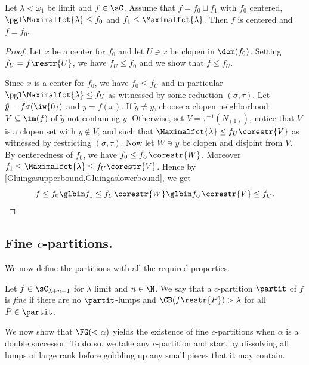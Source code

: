 \begin{lemma}\label{lem:gobblingLessThanLambda}
Let $\lambda<\omega_1$ be limit and $f\in\sC$.
Assume that $f=f_0\sqcup f_1$ with $f_0$ centered, $\pgl \Maximalfct{\lambda}\leq f_0$ and $f_1\leq \Maximalfct{\lambda}$. Then $f$ is centered and $f\equiv f_0$.
\end{lemma}
\begin{proof}
Let $x$ be a center for $f_0$ and let $U\ni x$ be clopen in $\dom (f_0)$. Setting $f_U=f\restr{U}$, we have $f_{U}\leq f_0$ and we show that $f\leq f_{U}$.

Since $x$ is a center for $f_0$, we have $f_0\leq f_{U}$ and in particular $\pgl \Maximalfct{\lambda}\leq f_{U}$ as witnessed by some reduction $(\sigma,\tau)$.
Let $\tilde{y}=f\sigma(\iw{0})$ and $y=f(x)$. If $\tilde{y}\neq y$, choose a clopen neighborhood $V\subseteq \im (f)$ of $\tilde{y}$ not containing $y$.
Otherwise, set $V=\tau^{-1}(N_{(1)})$, notice that $V$ is a clopen set with $y\notin V$, and such that $ \Maximalfct{\lambda}\leq f_{U}\corestr{V}$ as witnessed by restricting $(\sigma,\tau)$.
Now let $W\ni y$ be clopen and disjoint from $V$. By centeredness of $f_0$, we have $f_0\leq f_{U}\corestr{W}$. Moreover $f_1\leq\Maximalfct{\lambda}\leq f_{U}\corestr{V}$. Hence by \cref{Gluingasupperbound,Gluingaslowerbound}, we get
\[
f\leq f_0 \glbin f_1 \leq  f_{U}\corestr{W} \glbin  f_{U}\corestr{V} \leq f_{U}.\qedhere
\]
\end{proof}

\subsection{Fine $c$-partitions.}\label{DefFine}
We now define the partitions with all the required properties. 
\begin{definition}
Let $f\in \sC_{\lambda+n+1}$ for $\lambda$ limit and $n\in \N$. We say that a $c$-partition $\partit$ of $f$ is \emph{fine} if there are no $\partit$-lumps and $\CB(f\restr{P})>\lambda$ for all $P\in \partit$.

\end{definition}

\medskip

We now show that $\FG(<\alpha)$ yields the existence of fine $c$-partitions when $\alpha$ is a double successor.
To do so, we take any $c$-partition and start by dissolving all lumps of large rank before gobbling up any small pieces that it may contain.

